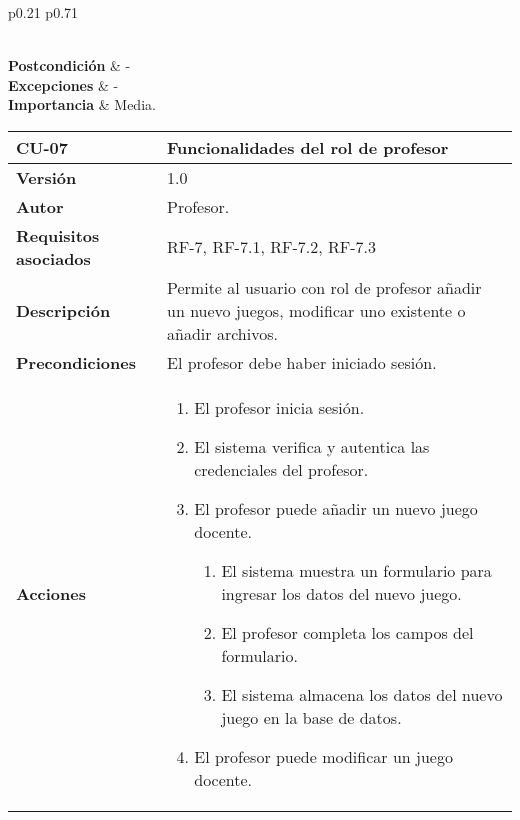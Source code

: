 \begin{table}[p]
\begin{tabularx}{\linewidth}{ p{0.21\columnwidth} p{0.71\columnwidth} }
\begin{enumerate}
		\end{enumerate}\\
         \textbf{Postcondición}             & - \\
		\textbf{Excepciones}             & - \\
		\textbf{Importancia}          & Media. \\
		\bottomrule
	\end{tabularx}
	\caption{CU-06 Funcionalidades del rol de administrador.}
\end{table}

\begin{table}[p]
	\centering
	\begin{tabularx}{\linewidth}{ p{} p{} }
		\toprule
		\textbf{CU-07}    & \textbf{ Funcionalidades del rol de profesor}\\
		\toprule
		\textbf{Versión}              & 1.0    \\
		\textbf{Autor}                & Profesor. \\
		\textbf{Requisitos asociados} & RF-7, RF-7.1, RF-7.2, RF-7.3 \\
		\textbf{Descripción}          & Permite al usuario con rol de profesor añadir un nuevo juegos, modificar uno existente o añadir archivos.\\
		\textbf{Precondiciones}         & El profesor debe haber iniciado sesión. \\
		\textbf{Acciones}             &
\begin{enumerate}
	\item El profesor inicia sesión.
	\item El sistema verifica y autentica las credenciales del profesor.
	\item El profesor puede añadir un nuevo juego docente.
    	\begin{enumerate}
    		\renewcommand{\labelenumii}{\arabic{enumi}.\arabic{enumii}}
    		\item El sistema muestra un formulario para ingresar los datos del nuevo juego.
    		\item El profesor completa los campos del formulario.
    		\item El sistema almacena los datos del nuevo juego en la base de datos.
    	\end{enumerate}
    \item El profesor puede modificar un juego docente.
    	\begin{enumerate}
    		\renewcommand{\labelenumii}{\arabic{enumi}.\arabic{enumii}}

\end{enumerate}
\end{enumerate}
\end{tabularx}
\end{table}
